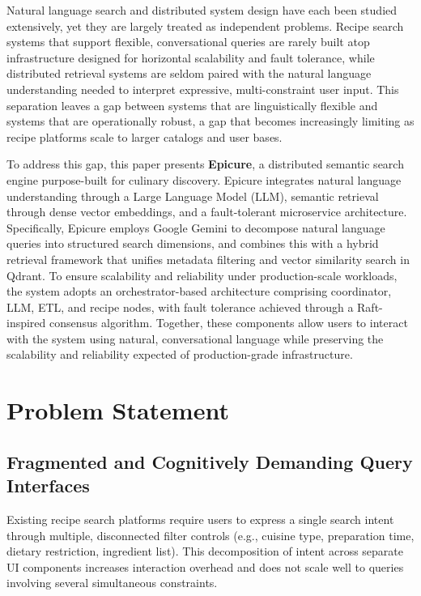 \documentclass[conference]{IEEEtran}
\begin{document}
Natural language search and distributed system design have each been studied extensively, yet they are largely treated as independent problems. Recipe search systems that support flexible, conversational queries are rarely built atop infrastructure designed for horizontal scalability and fault tolerance, while distributed retrieval systems are seldom paired with the natural language understanding needed to interpret expressive, multi-constraint user input. This separation leaves a gap between systems that are linguistically flexible and systems that are operationally robust, a gap that becomes increasingly limiting as recipe platforms scale to larger catalogs and user bases.

To address this gap, this paper presents \textbf{Epicure}, a distributed semantic search engine purpose-built for culinary discovery. Epicure integrates natural language understanding through a Large Language Model (LLM), semantic retrieval through dense vector embeddings, and a fault-tolerant microservice architecture. Specifically, Epicure employs Google Gemini to decompose natural language queries into structured search dimensions, and combines this with a hybrid retrieval framework that unifies metadata filtering and vector similarity search in Qdrant. To ensure scalability and reliability under production-scale workloads, the system adopts an orchestrator-based architecture comprising coordinator, LLM, ETL, and recipe nodes, with fault tolerance achieved through a Raft-inspired consensus algorithm. Together, these components allow users to interact with the system using natural, conversational language while preserving the scalability and reliability expected of production-grade infrastructure.

\section{Problem Statement}
\label{sec:problem_statement}
\subsection{Fragmented and Cognitively Demanding Query Interfaces}
Existing recipe search platforms require users to express a single search intent through multiple, disconnected filter controls (e.g., cuisine type, preparation time, dietary restriction, ingredient list). This decomposition of intent across separate UI components increases interaction overhead and does not scale well to queries involving several simultaneous constraints.
\end{document}
